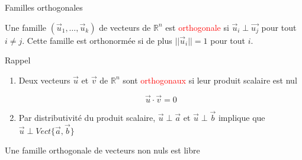 
\begin{parag}{Familles orthogonales}
    \begin{definition}
        Une famille $(\vec{u}_1, \dots, \vec{u}_k)$ de vecteurs de $\mathbb{R}^n$ est \textcolor{red}{orthogonale} si $\vec{u}_i \perp \vec{u_j}$ pour tout $i \neq j$. Cette famille est orthonormée si de plus $||\vec{u}_i|| = 1$ pour tout $i$.
    \end{definition}
    \begin{subparag}{Rappel}
        \begin{enumerate}
            \item Deux vecteurs $\vec{u}$ et $\vec{v}$ de $\mathbb{R}^n$ sont \textcolor{red}{orthogonaux} si leur produit scalaire est nul
            \begin{formule}
            \[\vec{u}\cdot \vec{v} = 0\]
            \end{formule}
            \item Par distributivité du produit scalaire, $\vec{u}\perp\vec{a}$ et $\vec{u} \perp \vec{b}$ implique que
            $\vec{u} \perp Vect\{\vec{a}, \vec{b}\}$
        \end{enumerate}
        \begin{theoreme}
            Une famille orthogonale de vecteurs non nuls est libre
        \end{theoreme}
    \end{subparag}
\end{parag}
